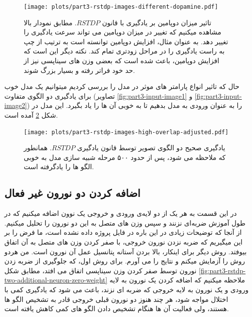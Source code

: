             \begin{figure}[!ht]
                \centering
                \captionsetup{width=.9\linewidth}
                \texttt{[image: plots/part3-rstdp-images-different-dopamine.pdf]} 
                \caption{تاثیر میزان دوپامین بر یادگیری با قانون 
                $RSTDP$. 
                مطابق نمودار بالا مشاهده میکنیم که تغییر در میزان دوپامین می تواند سرعت یادگیری را تغییر دهد. به عنوان مثال، افزایش دوپامین توانسته است به ترتیب از چپ به راست یادگیری را در مراحل زودتری تمام کند. نکته دیگر این است که افزایش دوپامین، باعث شده است که بعضی وزن های سیناپسی نیز از حد خود فراتر رفته و بسیار بزرگ شوند.
                }
                \label{fig:part3-rstdp-images-different-dopamine}
            \end{figure}
        
        حال که تاثیر انواع پارامتر های موثر در مدل را بررسی کردیم میتوانیم یک مدل خوب برای یادگیری دو الگوی متفاوت 
        (تصاویر 
        \ref{fig:part3-input-image1} و
        \ref{fig:part3-input-image2}) 
        را به عنوان ورودی به مدل بدهیم تا به خوبی آن ها را یاد بگیرد. این مدل در شکل 
        \ref{fig:part3-rstdp-images-high-overlap-adjusted}
        آمده است.
        \begin{figure}[!ht]
            \centering
            \captionsetup{width=.9\linewidth}
            \texttt{[image: plots/part3-rstdp-images-high-overlap-adjusted.pdf]} 
            \caption{یادگیری صحیح دو الگوی تصویر توسط قانون یادگیری 
            $RSTDP$. همانطور که ملاحظه می شود، پس از حدود ۵۰۰ مرحله شبیه سازی مدل به خوبی الگو ها را یادگرفته است.
            }
            \label{fig:part3-rstdp-images-high-overlap-adjusted}
        \end{figure}


    \newpage
    \subsection{اضافه کردن دو نورون غیر فعال}
        در این قسمت به هر یک از دو لایه‌ی ورودی و خروجی یک نوون اضافه میکنیم که در طول آموزش ضربه‌ای نزنند و سپس وزن های متصل به این دو نورون را تحلیل میکنیم. از آنجا که توضیحات زیادی در این باره در فایل پروژه داده نشده است، ما فرض را بر این میگیریم که ضربه نزدن نورون خروجی، با صفر کردن وزن های متصل به آن اتفاق بیوفتد. روش دیگر برای اینکار، بالا بردن آستانه پتانسیل عمل آن نورون است. من هردو روش را آزمایش میکنم و نتایج را می آورم. برای روش اول،  که جلوگیری از ضربه زدن نورون توسط صفر کردن وزن سیناپسی اتفاق می افتد، مطابق شکل 
        \ref{fig:part3-rstdp-two-additional-neuron-zero-weight}
        ملاحظه میکنیم که اضافه کردن یک نورون به لایه ورودی و یک نورون به لایه خروجی که ضربه ای نزند، باعث می شود که یادگیری کمی با اختلال مواجه شود، هر چند هنوز دو نورون قبلی خروجی قادر به تشخیص الگو ها هستند، ولی فعالیت آن ها هنگام تشخیص دادن الگو های کمی کاهش یافته است.

